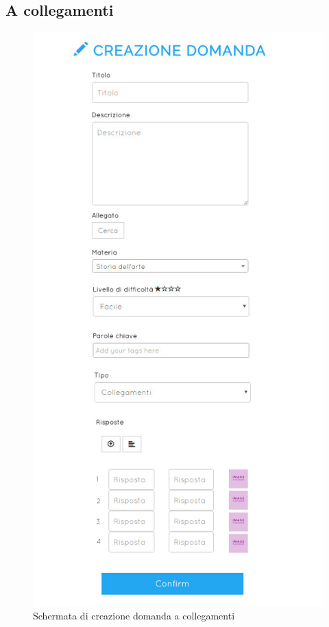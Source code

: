\documentclass[a4paper, titlepage]{article}
\begin{document}
	 \subsection{A collegamenti}
	 \begin{figure}[!h]
	 	\centering
	 	\includegraphics[scale=0.33]{Img/screen_CreazioneDomandaCollegamenti.png}
	 	\caption{Schermata di creazione domanda a collegamenti}
	 \end{figure}
\end{document}
